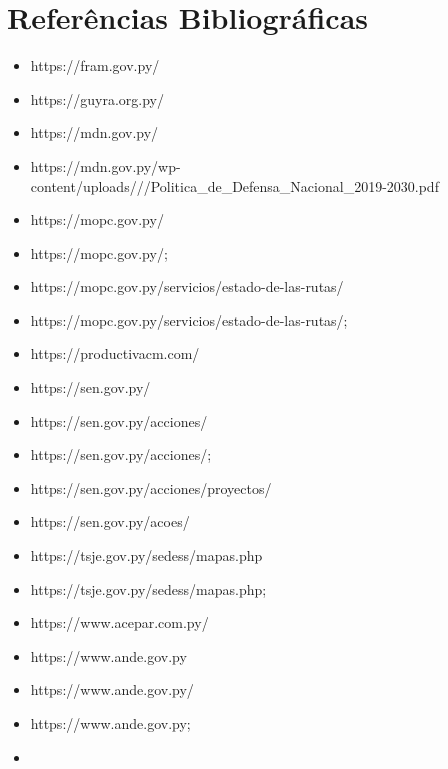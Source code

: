 \chapter*{Referências Bibliográficas}
\small
\begin{itemize}
\tightlist
\item
  https:/\allowbreak /fram.gov.py/\allowbreak 
\item
  https:/\allowbreak /guyra.org.py/\allowbreak 
\item
  https:/\allowbreak /mdn.gov.py/\allowbreak 
\item
  https:/\allowbreak /mdn.gov.py/\allowbreak wp-content/\allowbreak uploads///\allowbreak Politica\_de\_Defensa\_Nacional\_2019-2030.pdf
\item
  https:/\allowbreak /mopc.gov.py/\allowbreak 
\item
  https:/\allowbreak /mopc.gov.py/\allowbreak ;
\item
  https:/\allowbreak /mopc.gov.py/\allowbreak servicios/\allowbreak estado-de-las-rutas/\allowbreak 
\item
  https:/\allowbreak /mopc.gov.py/\allowbreak servicios/\allowbreak estado-de-las-rutas/\allowbreak ;
\item
  https:/\allowbreak /productivacm.com/\allowbreak 
\item
  https:/\allowbreak /sen.gov.py/\allowbreak 
\item
  https:/\allowbreak /sen.gov.py/\allowbreak acciones/\allowbreak 
\item
  https:/\allowbreak /sen.gov.py/\allowbreak acciones/\allowbreak ;
\item
  https:/\allowbreak /sen.gov.py/\allowbreak acciones/\allowbreak proyectos/\allowbreak 
\item
  https:/\allowbreak /sen.gov.py/\allowbreak acoes/\allowbreak 
\item
  https:/\allowbreak /tsje.gov.py/\allowbreak sedess/\allowbreak mapas.php
\item
  https:/\allowbreak /tsje.gov.py/\allowbreak sedess/\allowbreak mapas.php;
\item
  https:/\allowbreak /www.acepar.com.py/\allowbreak 
\item
  https:/\allowbreak /www.ande.gov.py
\item
  https:/\allowbreak /www.ande.gov.py/\allowbreak 
\item
  https:/\allowbreak /www.ande.gov.py;
\item

\end{itemize}
